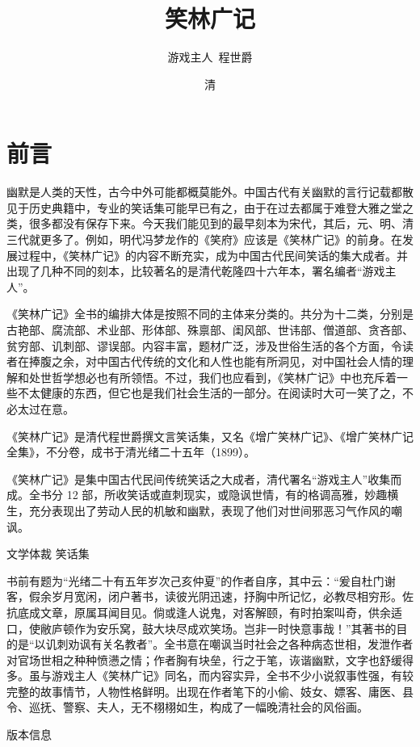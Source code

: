 \documentclass[12pt,UTF8]{ctexbook}
\title{\heiti\zihao{0} 笑林广记}
\author{游戏主人\ 程世爵}
\date{清}
\begin{document}
\maketitle
\tableofcontents

\frontmatter
\chapter{前言}

幽默是人类的天性，古今中外可能都概莫能外。中国古代有关幽默的言行记载都散见于历史典籍中，专业的笑话集可能早已有之，由于在过去都属于难登大雅之堂之类，很多都没有保存下来。今天我们能见到的最早刻本为宋代，其后，元、明、清三代就更多了。例如，明代冯梦龙作的《笑府》应该是《笑林广记》的前身。在发展过程中，《笑林广记》的内容不断充实，成为中国古代民间笑话的集大成者。并出现了几种不同的刻本，比较著名的是清代乾隆四十六年本，署名编者“游戏主人”。

《笑林广记》全书的编排大体是按照不同的主体来分类的。共分为十二类，分别是古艳部、腐流部、术业部、形体部、殊禀部、闺风部、世讳部、僧道部、贪吝部、贫穷部、讥刺部、谬误部。内容丰富，题材广泛，涉及世俗生活的各个方面，令读者在捧腹之余，对中国古代传统的文化和人性也能有所洞见，对中国社会人情的理解和处世哲学想必也有所领悟。不过，我们也应看到，《笑林广记》中也充斥着一些不太健康的东西，但它也是我们社会生活的一部分。在阅读时大可一笑了之，不必太过在意。

《笑林广记》是清代程世爵撰文言笑话集，又名《增广笑林广记》、《增广笑林广记全集》，不分卷，成书于清光绪二十五年（1899）。

《笑林广记》是集中国古代民间传统笑话之大成者，清代署名“游戏主人”收集而成。全书分 12 部，所收笑话或直刺现实，或隐讽世情，有的格调高雅，妙趣横生，充分表现出了劳动人民的机敏和幽默，表现了他们对世间邪恶习气作风的嘲讽。

文学体裁
笑话集

书前有题为“光绪二十有五年岁次己亥仲夏”的作者自序，其中云：“爰自杜门谢客，假余岁月宽闲，闭户著书，读彼光阴迅速，抒胸中所记忆，必教尽相穷形。佐抗底成文章，原属耳闻目见。倘或逢人说鬼，对客解颐，有时拍案叫奇，供余适口，使敝庐顿作为安乐窝，鼓大块尽成欢笑场。岂非一时快意事哉！”其著书的目的是“以讥刺劝讽有关名教者”。全书意在嘲讽当时社会之各种病态世相，发泄作者对官场世相之种种愤懑之情；作者胸有块垒，行之于笔，诙谐幽默，文字也舒缓得多。虽与游戏主人《笑林广记》同名，而内容实异，全书不少小说叙事性强，有较完整的故事情节，人物性格鲜明。出现在作者笔下的小偷、妓女、嫖客、庸医、县令、巡抚、警察、夫人，无不栩栩如生，构成了一幅晚清社会的风俗画。

版本信息
\end{document}
